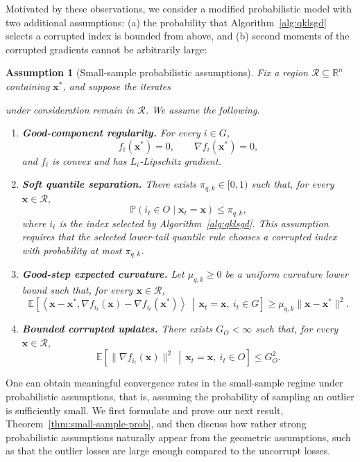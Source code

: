 \documentclass[11pt]{article}
\newcommand{\ve}[1]{\mathbf{#1}}
\newtheorem{assump}{Assumption}
\begin{document}
Motivated by these observations, we consider a modified probabilistic model with
two additional assumptions: (a) the probability that
Algorithm~\ref{alg:qklsgd} selects a corrupted index is bounded from above,
and (b) second moments of the corrupted gradients cannot be arbitrarily large:
\begin{assump}[Small-sample probabilistic assumptions]
\label{assump:small-sample-prob}
Fix a region \(\mathcal R\subseteq\mathbb{R}^n\) containing \(\ve{x}^*\), and
suppose the iterates

under consideration remain in \(\mathcal R\). We assume
the following.

\begin{enumerate}[label=\Roman*., ref=\Roman*]
    \item \textbf{Good-component regularity.}
    For every \(i\in G\),
    \[
    f_i(\ve{x}^*)=0,
    \qquad
    \nabla f_i(\ve{x}^*)=0,
    \]
    and \(f_i\) is convex and has \(L_i\)-Lipschitz gradient.


    \item \textbf{Soft quantile separation.}
    There exists \(\pi_{q,k}\in[0,1)\) such that, for every \(\ve{x}\in\mathcal R\),
    \[
    \mathbb{P}(i_t\in O\mid \ve{x}_t=\ve{x})\le \pi_{q,k},
    \]
    where \(i_t\) is the index selected by Algorithm~\ref{alg:qklsgd}.
    This assumption requires that the selected lower-tail quantile rule
    chooses a corrupted index with probability at most \(\pi_{q,k}\).

    \item \textbf{Good-step expected curvature.} Let \(\mu_{q,k}\ge0\) be a uniform curvature lower bound such that, for
every \(\ve{x}\in\mathcal R\),
    \[
    \mathbb{E}\!\left[
    \left\langle
    \ve{x}-\ve{x}^*,
    \nabla f_{i_t}(\ve{x})-\nabla f_{i_t}(\ve{x}^*)
    \right\rangle
    \,\middle|\,
    \ve{x}_t=\ve{x},\ i_t\in G
    \right]
    \ge
    \mu_{q,k}\|\ve{x}-\ve{x}^*\|^2.
    \]


    \item \textbf{Bounded corrupted updates.}
    There exists \(G_O<\infty\) such that, for every \(\ve{x}\in\mathcal R\),
    \[
    \mathbb{E}\!\left[
    \|\nabla f_{i_t}(\ve{x})\|^2
    \,\middle|\,
    \ve{x}_t=\ve{x},\ i_t\in O
    \right]
    \le
    G_O^2.
    \]
\end{enumerate}
\end{assump}

One can obtain meaningful convergence rates in the small-sample regime under probabilistic assumptions, that is, assuming the probability of sampling an outlier is sufficiently small. We first formulate and prove our next result, {Theorem~\ref{thm:small-sample-prob}}, and then discuss how rather strong probabilistic {assumptions} naturally appear from the geometric assumptions, such as that the outlier losses are large enough compared to the uncorrupt losses.
\end{document}
